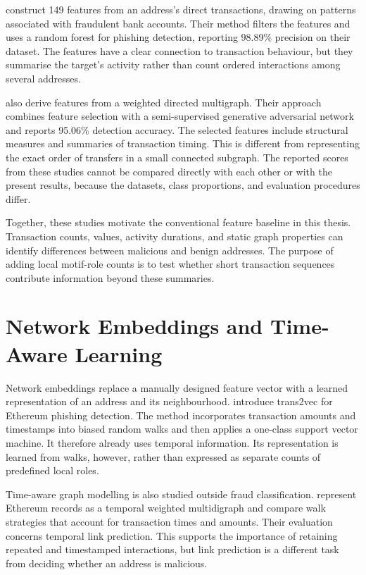 \documentclass{thesisclass}
\begin{document}
\citet{chen2022phishing} construct 149 features from an address's direct
transactions, drawing on patterns associated with fraudulent bank accounts.
Their method filters the features and uses a random forest for phishing
detection, reporting 98.89\% precision on their dataset. The features have a
clear connection to transaction behaviour, but they summarise the target's
activity rather than count ordered interactions among several addresses.

\citet{sanjalawe2023atd} also derive features from a weighted directed
multigraph. Their approach combines feature selection with a semi-supervised
generative adversarial network and reports 95.06\% detection accuracy.
The selected features include structural measures and summaries of transaction
timing. This is different from representing the exact order of transfers in a
small connected subgraph. The reported scores from these studies cannot be
compared directly with each other or with the present results, because the
datasets, class proportions, and evaluation procedures differ.

Together, these studies motivate the conventional feature baseline in this
thesis. Transaction counts, values, activity durations, and static graph
properties can identify differences between malicious and benign addresses.
The purpose of adding local motif-role counts is to test whether short
transaction sequences contribute information beyond these summaries.

\section{Network Embeddings and Time-Aware Learning}
\label{sec:related_temporal_learning}

Network embeddings replace a manually designed feature vector with a learned
representation of an address and its neighbourhood.
\citet{wu2020phishers} introduce trans2vec for Ethereum phishing detection.
The method incorporates transaction amounts and timestamps into biased random
walks and then applies a one-class support vector machine. It therefore already
uses temporal information. Its representation is learned from walks, however,
rather than expressed as separate counts of predefined local roles.

Time-aware graph modelling is also studied outside fraud classification.
\citet{wu2020temporal} represent Ethereum records as a temporal weighted
multidigraph and compare walk strategies that account for transaction times and
amounts. Their evaluation concerns temporal link prediction. This supports the
importance of retaining repeated and timestamped interactions, but link
prediction is a different task from deciding whether an address is malicious.
\end{document}
